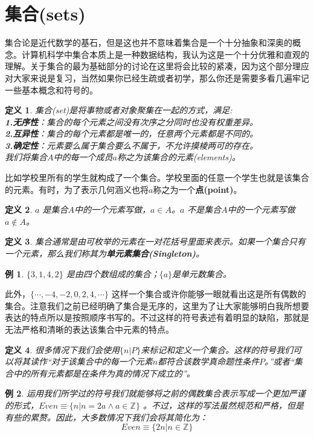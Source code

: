 \documentclass[mathserif,hyperref,UTF8,openany,b5paper]{ctexbook}
\newtheorem{exmp}{例}[section]
\newtheorem{defn}{定义}[section]
\begin{document}
\section{集合(sets)}
\thispagestyle{fancy}
集合论是近代数学的基石，但是这也并不意味着集合是一个十分抽象和深奥的概念。计算机科学中集合本质上是一种数据结构，我认为这是一个十分优雅和直观的理解。关于集合的最为基础部分的讨论在这里将会比较的紧凑，因为这个部分理应对大家来说是复习，当然如果你已经生疏或者初学，那么你还是需要多看几遍牢记一些基本概念和符号的。
\begin{defn}
集合(set)是将事物或者对象聚集在一起的方式，满足:\\
\textbf{1.无序性}：集合的每个元素之间没有次序之分同时也没有权重差异。\\
\textbf{2.互异性}：集合的每个元素都是唯一的，任意两个元素都是不同的。\\
\textbf{3.确定性}：元素要么属于集合要么不属于，不允许摸棱两可的存在。\\
我们将集合$A$中的每一个成员$a$称之为该集合的元素(elements)。
\end{defn}
比如学校里所有的学生就构成了一个集合。学校里面的任意一个学生也就是该集合的元素。有时，为了表示几何涵义也将$a$称之为一个\textbf{点(point)}。
\begin{defn}
$a$ 是集合$A$中的一个元素写做，$a\in A$。$a$ 不是集合$A$中的一个元素写做$a\notin A$。
\end{defn}
\begin{defn}
集合通常是由可枚举的元素在一对花括号里面来表示。如果一个集合只有一个元素，那么我们称其为\textbf{单元素集合(Singleton)}。
\end{defn}
\begin{exmp}
$ \{3,1,4,2\} $ 是由四个数组成的集合；$\{a\}$是单元数集合。
\end{exmp}
此外，$ \{\cdots,-4,-2,0,2,4,\cdots\} $ 这样一个集合或许你能够一眼就看出这是所有偶数的集合。注意我们之前已经明确了集合是无序的，这里为了让大家能够明白我所想要表达的特点所以是按照顺序书写的。不过这样的符号表述有着明显的缺陷，那就是无法严格和清晰的表达该集合中元素的特点。
\begin{defn}
很多情况下我们会使用$\{n|P\} $来标记和定义一个集合。这样的符号我们可以将其读作“对于该集合中的每一个元素$n$都符合该数学真命题性条件$P$。”或者“集合中的所有元素都是在条件为真的情况下成立的”。
\end{defn}
\begin{exmp}
运用我们所学过的符号我们就能够将之前的偶数集合表示写成一个更加严谨的形式，$ Even \equiv \{n|n = 2a \land a\in \mathbb{Z}\} $ 。不过，这样的写法虽然规范和严格，但是有些的累赘。因此，大多数情况下我们会将其简化为： 
\begin{equation}
    Even \equiv \{2n|n\in \mathbb{Z}\}
\end{equation}
\end{exmp}
\end{document}

